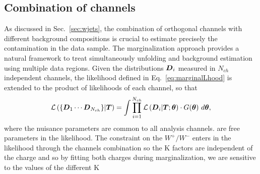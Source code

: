 \documentclass[a4paper]{article}
\begin{document}
\subsection{Combination of channels}
\label{sec:chcomb}
As discussed in Sec.~\ref{sec:wjets}, the combination of
orthogonal channels with different background compositions is crucial
to estimate precisely the \wjets{} contamination in the
data sample. 
The marginalization approach provides a natural framework to treat
simultaneously unfolding and background estimation using
multiple data regions. Given the distributions $\boldsymbol{D}{}_i$ measured in $N_{ch}$
independent channels, the likelihood defined in Eq.~\ref{eq:marginalLhood}
is extended to the product of likelihoods of each channel, so that
\begin{equation}
\mathcal{L}\left(\{\boldsymbol{D}{}_1\cdots{}\boldsymbol{D}{}_{N_{ch}}\}|\boldsymbol{T}{}\right)=
\int
\prod_{i=1}^{N_{ch}}\mathcal{L}\left(\boldsymbol{D}{}_i|\boldsymbol{T}{};\boldsymbol{\theta{}}{}\right)
\cdot{} G(\boldsymbol{\theta{}}{})
~d\boldsymbol{\theta{}}{},
\end{equation}
where the nuisance parameters are common to all analysis channels.
are free parameters in the likelihood.
The constraint on the $W^{+}/W^{-}$ enters in the likelihood 
through the channels combination so the K factors are independent 
of the charge and so by fitting both charges during marginalization, we
 are sensitive to the values of the different K
\end{document}
